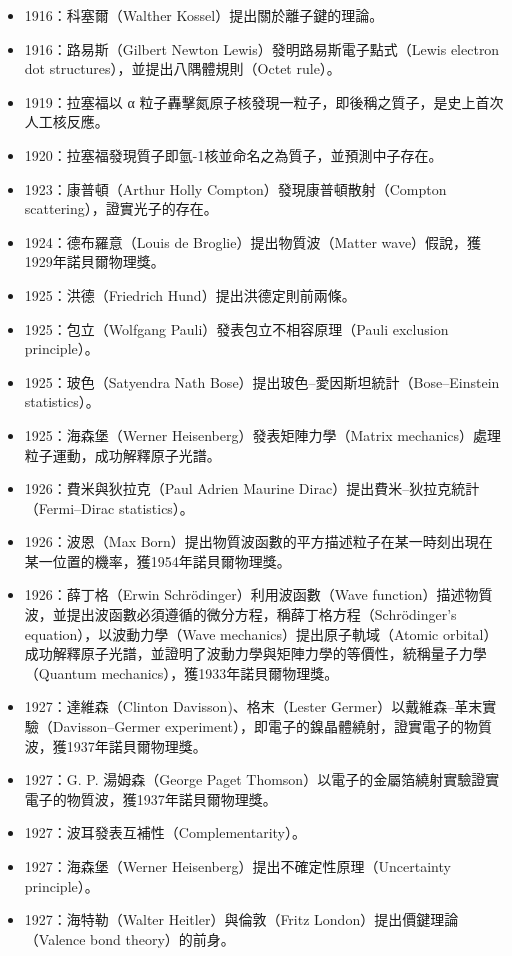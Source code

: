 \documentclass[a4paper,12pt]{article}
\begin{document}
\begin{itemize}
\item 1916：科塞爾（Walther Kossel）提出關於離子鍵的理論。
\item 1916：路易斯（Gilbert Newton Lewis）發明路易斯電子點式（Lewis electron dot structures），並提出八隅體規則（Octet rule）。
\item 1919：拉塞福以 α 粒子轟擊氮原子核發現一粒子，即後稱之質子，是史上首次人工核反應。
\item 1920：拉塞福發現質子即氫-1核並命名之為質子，並預測中子存在。
\item 1923：康普頓（Arthur Holly Compton）發現康普頓散射（Compton scattering），證實光子的存在。
\item 1924：德布羅意（Louis de Broglie）提出物質波（Matter wave）假說，獲1929年諾貝爾物理獎。
\item 1925：洪德（Friedrich Hund）提出洪德定則前兩條。
\item 1925：包立（Wolfgang Pauli）發表包立不相容原理（Pauli exclusion principle）。
\item 1925：玻色（Satyendra Nath Bose）提出玻色–愛因斯坦統計（Bose–Einstein statistics）。
\item 1925：海森堡（Werner Heisenberg）發表矩陣力學（Matrix mechanics）處理粒子運動，成功解釋原子光譜。
\item 1926：費米與狄拉克（Paul Adrien Maurine Dirac）提出費米–狄拉克統計（Fermi–Dirac statistics）。
\item 1926：波恩（Max Born）提出物質波函數的平方描述粒子在某一時刻出現在某一位置的機率，獲1954年諾貝爾物理獎。
\item 1926：薛丁格（Erwin Schrödinger）利用波函數（Wave function）描述物質波，並提出波函數必須遵循的微分方程，稱薛丁格方程（Schrödinger's equation），以波動力學（Wave mechanics）提出原子軌域（Atomic orbital）成功解釋原子光譜，並證明了波動力學與矩陣力學的等價性，統稱量子力學（Quantum mechanics），獲1933年諾貝爾物理獎。
\item 1927：達維森（Clinton Davisson)、格末（Lester Germer）以戴維森–革末實驗（Davisson–Germer experiment），即電子的鎳晶體繞射，證實電子的物質波，獲1937年諾貝爾物理獎。
\item 1927：G. P. 湯姆森（George Paget Thomson）以電子的金屬箔繞射實驗證實電子的物質波，獲1937年諾貝爾物理獎。
\item 1927：波耳發表互補性（Complementarity）。
\item 1927：海森堡（Werner Heisenberg）提出不確定性原理（Uncertainty principle）。
\item 1927：海特勒（Walter Heitler）與倫敦（Fritz London）提出價鍵理論（Valence bond theory）的前身。

\end{itemize}
\end{document}
